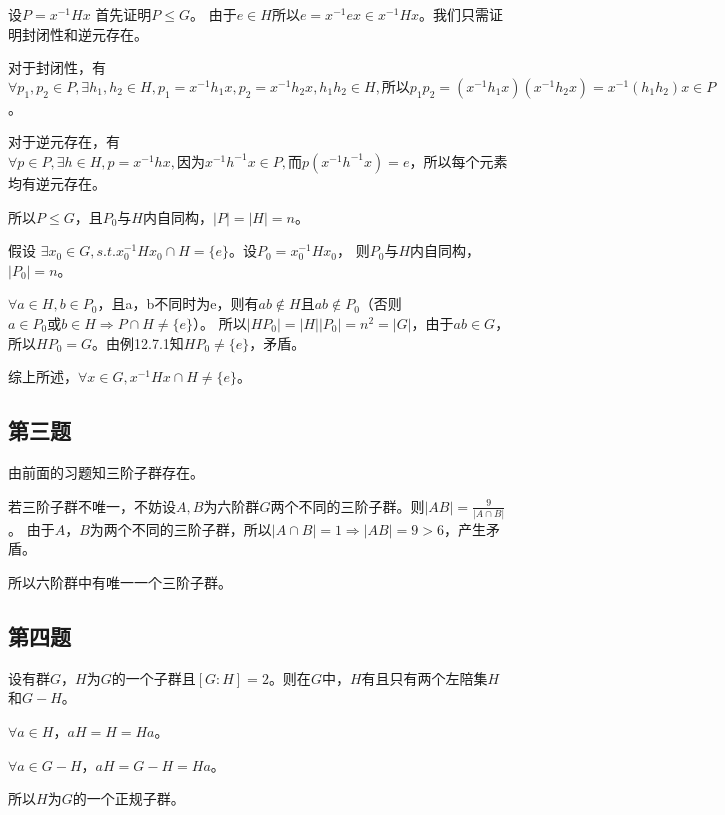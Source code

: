 \documentclass[12pt,onecolumn]{article}
\theoremstyle{plain}
\begin{document}
\begin{proof*}
  设$P = x^{-1}Hx$
  首先证明$P \leq G$。
  由于$e \in H$所以$e = x^{-1}ex \in x^{-1}Hx$。我们只需证明封闭性和逆元存在。

  对于封闭性，有
  $\forall p_1, p_2 \in P, \exists h_1, h_2 \in H, p_1 = x^{-1}h_1x, p_2 = x^{-1}h_2x , h_1h_2 \in H,\text{所以}p_1p_2 = (x^{-1}h_1x)(x^{-1}h_2x) = x^{-1}(h_1h_2)x \in P$。

  对于逆元存在，有$\forall p \in P, \exists h \in H, p = x^{-1}hx, \text{因为}x^{-1}h^{-1}x \in P,\text{而} p(x^{-1}h^{-1}x) = e$，所以每个元素均有逆元存在。

  所以$ P \leq G$，且$P_0$与$H$内自同构，$|P| = |H| = n$。

  假设 $\exists x_0 \in G, s.t. x_0^{-1}Hx_0 \cap H = \{e\}$。设$P_0 = x_0^{-1}Hx_0$，
  则$P_0$与$H$内自同构，$|P_0| = n$。

  $\forall a \in H, b \in P_0$，且a，b不同时为e，则有$ab \notin H$且$ab \notin P_0$（否则$a \in P_0\text{或}b \in H \Rightarrow P \cap H \neq \{e\}$）。
  所以$|HP_0| = |H||P_0| = n^2 = |G|$，由于$ab \in G$，所以$HP_0 = G$。由例12.7.1知$HP_0 \neq \{e\}$，矛盾。

  综上所述，$\forall x \in G, x^{-1}Hx \cap H \neq \{e\}$。
\end{proof*}

\subsection{第三题}
\begin{proof*}
  由前面的习题知三阶子群存在。

  若三阶子群不唯一，不妨设$A,B$为六阶群$G$两个不同的三阶子群。则$|AB| = \frac{9}{|A \cap B|}$。
  由于$A$，$B$为两个不同的三阶子群，所以$|A \cap B| = 1 \Rightarrow |AB| = 9 > 6$，产生矛盾。

  所以六阶群中有唯一一个三阶子群。
\end{proof*}

\subsection{第四题}
\begin{proof*}
  设有群$G$，$H$为$G$的一个子群且$[G:H] = 2$。则在$G$中，$H$有且只有两个左陪集$H$和$G-H$。

  $\forall a \in H$，$aH = H = Ha$。

  $\forall a \in G - H$，$aH = G - H = Ha$。

  所以$H$为$G$的一个正规子群。
\end{proof*}
\end{document}
